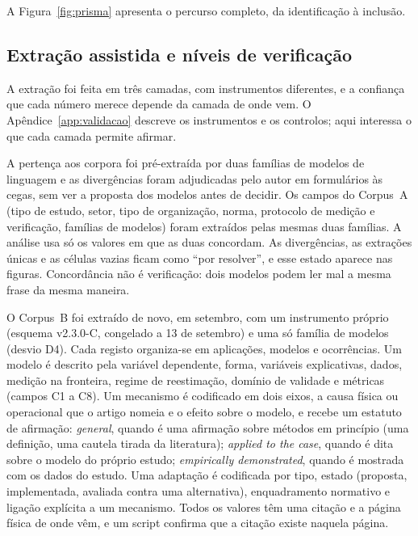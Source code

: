 A Figura~\ref{fig:prisma} apresenta o percurso completo, da identificação à inclusão.



\subsection{Extração assistida e níveis de verificação}
\label{sec:extracao-verificacao}

A extração foi feita em três camadas, com instrumentos diferentes, e a
confiança que cada número merece depende da camada de onde vem. O
Apêndice~\ref{app:validacao} descreve os instrumentos e os controlos;
aqui interessa o que cada camada permite afirmar.

A pertença aos corpora foi pré-extraída por duas famílias de modelos de
linguagem e as divergências foram adjudicadas pelo autor em formulários às
cegas, sem ver a proposta dos modelos antes de decidir.
Os campos do Corpus~A (tipo de estudo, setor, tipo de organização, norma,
protocolo de medição e verificação, famílias de modelos) foram extraídos
pelas mesmas duas famílias. A análise usa só os valores em que as duas
concordam. As divergências, as extrações únicas e as células vazias ficam
como ``por resolver'', e esse estado aparece nas figuras. Concordância não é
verificação: dois modelos podem ler mal a mesma frase da mesma maneira.

O Corpus~B foi extraído de novo, em setembro, com um instrumento próprio
(esquema v2.3.0-C, congelado a 13 de setembro) e uma só família de modelos
(desvio D4). Cada registo organiza-se em aplicações, modelos e ocorrências.
Um modelo é descrito pela variável dependente, forma, variáveis explicativas,
dados, medição na fronteira, regime de reestimação, domínio de validade e
métricas (campos C1 a C8). Um mecanismo é codificado em dois eixos, a causa
física ou operacional que o artigo nomeia e o efeito sobre o modelo, e
recebe um estatuto de afirmação: \emph{general}, quando é uma afirmação
sobre métodos em princípio (uma definição, uma cautela tirada da
literatura); \emph{applied to the case}, quando é dita sobre o modelo do
próprio estudo; \emph{empirically demonstrated}, quando é mostrada com os
dados do estudo. Uma adaptação é codificada por tipo, estado (proposta,
implementada, avaliada contra uma alternativa), enquadramento normativo e
ligação explícita a um mecanismo. Todos os valores têm uma citação e a
página física de onde vêm, e um script confirma que a citação existe
naquela página.

